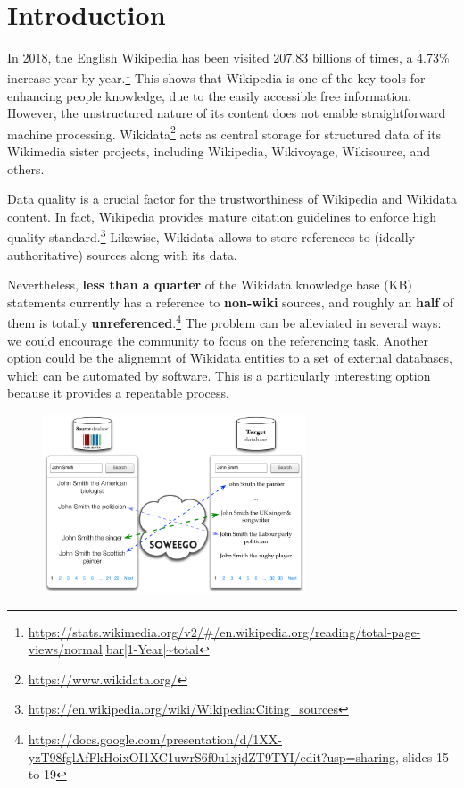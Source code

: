 \clearpage
\newpage
\mbox{~}
\clearpage
\newpage

\chapter{Introduction}
\label{cha:intro}
In 2018, the English Wikipedia has been visited 207.83 billions of times, a 4.73\% increase year by year.\footnote{\url{https://stats.wikimedia.org/v2/\#/en.wikipedia.org/reading/total-page-views/normal|bar|1-Year|~total}} This shows that Wikipedia is one of the key tools for enhancing people knowledge, due to the easily accessible free information. However, the unstructured nature of its content does not enable straightforward machine processing.
Wikidata\footnote{\url{https://www.wikidata.org/}} acts as central storage for structured data of its Wikimedia sister projects, including Wikipedia, Wikivoyage, Wikisource, and others.

Data quality is a crucial factor for the trustworthiness of Wikipedia and Wikidata content. In fact, Wikipedia provides mature citation guidelines to enforce high quality standard.\footnote{\url{https://en.wikipedia.org/wiki/Wikipedia:Citing_sources}}
Likewise, Wikidata allows to store references to (ideally authoritative) sources along with its data.

Nevertheless, \textbf{less than a quarter} of the Wikidata knowledge base (KB) statements currently has a reference to \textbf{non-wiki} sources, and roughly an \textbf{half} of them is totally \textbf{unreferenced}.\footnote{\url{https://docs.google.com/presentation/d/1XX-yzT98fglAfFkHoixOI1XC1uwrS6f0u1xjdZT9TYI/edit?usp=sharing}, slides 15 to 19}
The problem can be alleviated in several ways: we could encourage the community to focus on the referencing task. Another option could be the alignemnt of Wikidata entities to a set of external databases, which can be automated by software. This is a particularly interesting option because it provides a repeatable process.

\begin{figure}[t]
  \begin{center}
   \includegraphics[height=200px]{images/matchexample.png}
   \label{fig:soweegomatch}
  \end{center}
\end{figure}

